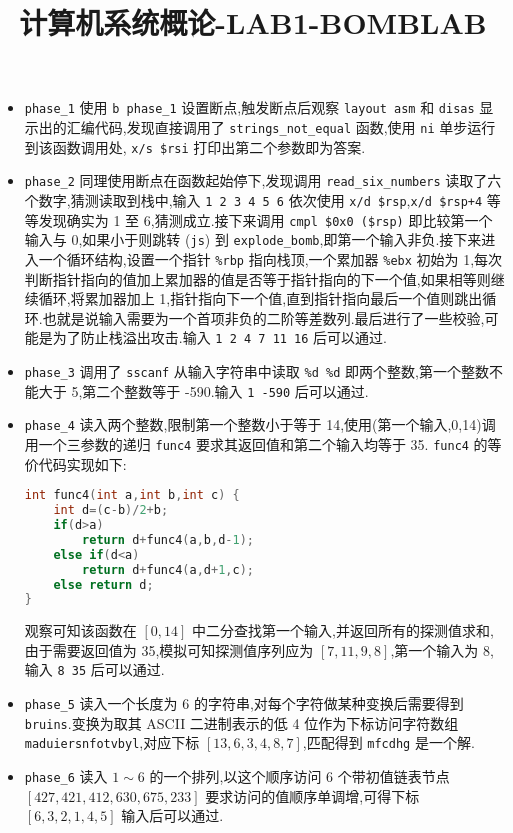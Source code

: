 
\usepackage{../../homeworks_preamble}
\title{计算机系统概论-LAB1-BOMBLAB}


    \maketitle
    \begin{itemize}
        \item \texttt{phase\_1} 使用 \texttt{b \*phase\_1} 设置断点,触发断点后观察 \texttt{layout asm} 和 \texttt{disas} 显示出的汇编代码,发现直接调用了 \texttt{strings\_not\_equal} 函数,使用 \texttt{ni} 单步运行到该函数调用处, \texttt{x/s \$rsi} 打印出第二个参数即为答案.
        \item \texttt{phase\_2} 同理使用断点在函数起始停下,发现调用 \texttt{read\_six\_numbers} 读取了六个数字,猜测读取到栈中,输入 \texttt{1 2 3 4 5 6} 依次使用 \texttt{x/d \$rsp},\texttt{x/d \$rsp+4} 等等发现确实为 1 至 6,猜测成立.接下来调用 \texttt{cmpl \$0x0 (\$rsp)} 即比较第一个输入与 0,如果小于则跳转 (\texttt{js}) 到 \texttt{explode\_bomb},即第一个输入非负.接下来进入一个循环结构,设置一个指针 \texttt{\%rbp} 指向栈顶,一个累加器 \texttt{\%ebx} 初始为 1,每次判断指针指向的值加上累加器的值是否等于指针指向的下一个值,如果相等则继续循环,将累加器加上 1,指针指向下一个值,直到指针指向最后一个值则跳出循环.也就是说输入需要为一个首项非负的二阶等差数列.最后进行了一些校验,可能是为了防止栈溢出攻击.输入 \texttt{1 2 4 7 11 16} 后可以通过.
        \item \texttt{phase\_3} 调用了 \texttt{sscanf} 从输入字符串中读取 \texttt{\%d \%d} 即两个整数,第一个整数不能大于 5,第二个整数等于 -590.输入 \texttt{1 -590} 后可以通过.
        \item \texttt{phase\_4} 读入两个整数,限制第一个整数小于等于 14,使用(第一个输入,0,14)调用一个三参数的递归 \texttt{func4} 要求其返回值和第二个输入均等于 35. \texttt{func4} 的等价代码实现如下:

            \begin{lstlisting}[language=C++]
int func4(int a,int b,int c) {
    int d=(c-b)/2+b;
    if(d>a)
        return d+func4(a,b,d-1);
    else if(d<a)
        return d+func4(a,d+1,c);
    else return d;
}
            \end{lstlisting}

            观察可知该函数在 $[0,14]$ 中二分查找第一个输入,并返回所有的探测值求和,由于需要返回值为 35,模拟可知探测值序列应为 $[7,11,9,8]$,第一个输入为 8,输入 \texttt{8 35} 后可以通过.
        \item \texttt{phase\_5} 读入一个长度为 6 的字符串,对每个字符做某种变换后需要得到 \texttt{bruins}.变换为取其 ASCII 二进制表示的低 4 位作为下标访问字符数组 \texttt{maduiersnfotvbyl},对应下标 $[13,6,3,4,8,7]$,匹配得到 \texttt{mfcdhg} 是一个解. 
        \item \texttt{phase\_6} 读入 $1\sim{}6$ 的一个排列,以这个顺序访问 6 个带初值链表节点 $[427,421,412,630,675,233]$ 要求访问的值顺序单调增,可得下标 $[6,3,2,1,4,5]$ 输入后可以通过.
    \end{itemize}

